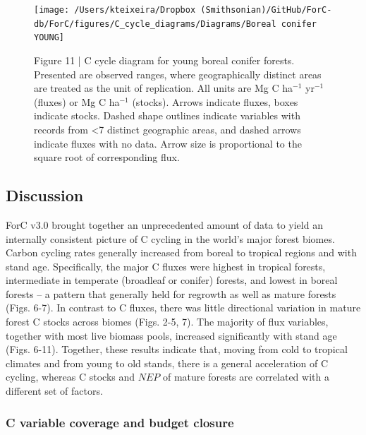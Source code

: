 \documentclass[
]{article}
\begin{document}
\begin{landscape}
\begin{figure}[H]

{\centering \texttt{[image: /Users/kteixeira/Dropbox (Smithsonian)/GitHub/ForC-db/ForC/figures/C\_cycle\_diagrams/Diagrams/Boreal conifer YOUNG]} 

}

\caption{Figure 11 | C cycle diagram for young boreal conifer forests. Presented are observed ranges, where geographically distinct areas are treated as the unit of replication. All units are Mg C ha$^{-1}$ yr$^{-1}$ (fluxes) or Mg C ha$^{-1}$ (stocks). Arrows indicate fluxes, boxes indicate stocks. Dashed shape outlines indicate variables with records from <7 distinct geographic areas, and dashed arrows indicate fluxes with no data. Arrow size is proportional to the square root of corresponding flux.}\label{fig:unnamed-chunk-17}
\end{figure}
\end{landscape}

\hypertarget{discussion}{%
\subsection{Discussion}\label{discussion}}

ForC v3.0 brought together an unprecedented amount of data to yield an
internally consistent picture of C cycling in the world's major forest
biomes. Carbon cycling rates generally increased from boreal to tropical
regions and with stand age. Specifically, the major C fluxes were
highest in tropical forests, intermediate in temperate (broadleaf or
conifer) forests, and lowest in boreal forests -- a pattern that
generally held for regrowth as well as mature forests (Figs. 6-7). In
contrast to C fluxes, there was little directional variation in mature
forest C stocks across biomes (Figs. 2-5, 7). The majority of flux
variables, together with most live biomass pools, increased
significantly with stand age (Figs. 6-11). Together, these results
indicate that, moving from cold to tropical climates and from young to
old stands, there is a general acceleration of C cycling, whereas C
stocks and \(NEP\) of mature forests are correlated with a different set
of factors.

\hypertarget{c-variable-coverage-and-budget-closure}{%
\subsubsection{C variable coverage and budget
closure}\label{c-variable-coverage-and-budget-closure}}
\end{document}

